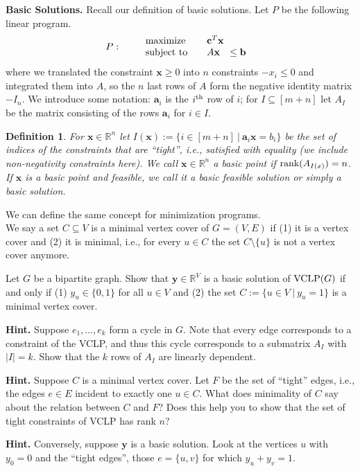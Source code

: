 \documentclass[11pt,a4paper,oneside]{article}
\newtheorem{definition}[theorem]{Definition}
\newcommand{\nth}[1]{#1\textsuperscript{th}}
\newcommand{\R}{\mathbb{R}}
\newcommand{\x}{\mathbf{x}}
\newcommand{\y}{\mathbf{y}}
\newcommand{\rank}{\textnormal{rank}}
\renewcommand{\a}{\mathbf{a}}
\renewcommand{\b}{\mathbf{b}}
\begin{document}
\textbf{Basic Solutions.} Recall our definition of basic solutions.
Let $P$ be the following linear program.
\begin{align*}
P: \qquad
\begin{array}{lrl}
\textnormal{maximize} \quad & \multicolumn{2}{l}{\mathbf{c}^T \x} \\
\textnormal{subject to} \quad & A\x & \leq \b \ 
\end{array}
\end{align*}
where we translated the constraint $\x \geq 0$ into $n$ constraints
$-x_i \leq 0$ and integrated them into $A$, so 
the $n$ last rows of $A$ form the 
negative identity matrix $-I_n$. We introduce some notation: $\a_i$ is the $\nth{i}$ row of $i$;
for $I \subseteq [m+n]$ let $A_I$ be the matrix
consisting of the rows $\a_i$ for $i \in I$.
\begin{definition}
	For $\x \in \R^n$ let $I(\x) := \{i \in [m+n] \ | \ \a_i \x = b_i\}$
	be the set of indices of the constraints that are ``tight'', i.e.,
	satisfied with equality (we include non-negativity constraints here).  We call $\x \in \R^n$ a {\em basic point}
	if $\rank(A_{I(x)}) = n$.  If $\x$ is a basic point and feasible, we
	call it a {\em basic feasible solution} or simply a {\em basic
		solution}.
\end{definition}
We can define the same concept for minimization programs. \\

We say a set $C \subseteq V$ is a minimal vertex cover of $G = (V,E)$ if 
(1) it is a vertex cover and (2) it is minimal, i.e., for every $u \in C$ the set
$C \setminus \{u\}$ is not a vertex cover anymore.

\begin{problem}{4}
	\statement
     Let $G$ be a bipartite graph.
    Show that $\y \in \R^{V}$ is a basic solution of ${\rm VCLP}(G)$ if and only if 
    (1) $y_u \in \{0,1\}$ for all $u \in V$ and (2) the set $C := \{u \in V \ | \ y_u = 1\}$ is a 
    minimal vertex cover.
    
    \solution
    
\end{problem}

\textbf{Hint.} Suppose $e_1,\dots,e_k$ form a cycle in $G$. Note that every edge corresponds
to a constraint of the VCLP, and thus this cycle corresponds to a submatrix $A_I$ with
$|I|= k$. Show that the $k$ rows of $A_I$ are linearly dependent. 

\textbf{Hint.} Suppose $C$ is a minimal vertex cover. Let $F$ be the set of ``tight'' edges, i.e., 
the edges $e \in E$ incident to exactly one $u \in C$. What does minimality of $C$ say 
about the relation between $C$ and $F$? Does this help you to show that the set
of tight constraints of VCLP has rank $n$?

\textbf{Hint.} Conversely, suppose $\y$ is a basic solution. Look at the vertices
$u$ with $y_0 = 0$ and the ``tight edges'', those $e = \{u,v\}$ for which $y_u + y_v = 1$.
\end{document}
